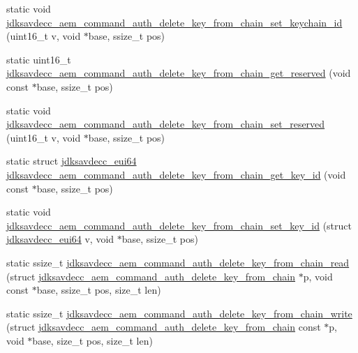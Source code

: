 \begin{DoxyCompactItemize}
\item 
static void \hyperlink{group__command__auth__delete__key__from__chain_ga363dacdcc27889331e0861ae0f44d4d0}{jdksavdecc\+\_\+aem\+\_\+command\+\_\+auth\+\_\+delete\+\_\+key\+\_\+from\+\_\+chain\+\_\+set\+\_\+keychain\+\_\+id} (uint16\+\_\+t v, void $\ast$base, ssize\+\_\+t pos)
\item 
static uint16\+\_\+t \hyperlink{group__command__auth__delete__key__from__chain_ga49a6f38c77bc0d0ead0b9743194297f9}{jdksavdecc\+\_\+aem\+\_\+command\+\_\+auth\+\_\+delete\+\_\+key\+\_\+from\+\_\+chain\+\_\+get\+\_\+reserved} (void const $\ast$base, ssize\+\_\+t pos)
\item 
static void \hyperlink{group__command__auth__delete__key__from__chain_gac25781fadb6b56cff3c42fd8d4728aed}{jdksavdecc\+\_\+aem\+\_\+command\+\_\+auth\+\_\+delete\+\_\+key\+\_\+from\+\_\+chain\+\_\+set\+\_\+reserved} (uint16\+\_\+t v, void $\ast$base, ssize\+\_\+t pos)
\item 
static struct \hyperlink{structjdksavdecc__eui64}{jdksavdecc\+\_\+eui64} \hyperlink{group__command__auth__delete__key__from__chain_ga00b12cbc1d1695d6a006ba72fa5a9ba2}{jdksavdecc\+\_\+aem\+\_\+command\+\_\+auth\+\_\+delete\+\_\+key\+\_\+from\+\_\+chain\+\_\+get\+\_\+key\+\_\+id} (void const $\ast$base, ssize\+\_\+t pos)
\item 
static void \hyperlink{group__command__auth__delete__key__from__chain_ga246f987b0bd36f564dd66f7570c59709}{jdksavdecc\+\_\+aem\+\_\+command\+\_\+auth\+\_\+delete\+\_\+key\+\_\+from\+\_\+chain\+\_\+set\+\_\+key\+\_\+id} (struct \hyperlink{structjdksavdecc__eui64}{jdksavdecc\+\_\+eui64} v, void $\ast$base, ssize\+\_\+t pos)
\item 
static ssize\+\_\+t \hyperlink{group__command__auth__delete__key__from__chain_gad3136912c47d7ab8cd7a63e71f907559}{jdksavdecc\+\_\+aem\+\_\+command\+\_\+auth\+\_\+delete\+\_\+key\+\_\+from\+\_\+chain\+\_\+read} (struct \hyperlink{structjdksavdecc__aem__command__auth__delete__key__from__chain}{jdksavdecc\+\_\+aem\+\_\+command\+\_\+auth\+\_\+delete\+\_\+key\+\_\+from\+\_\+chain} $\ast$p, void const $\ast$base, ssize\+\_\+t pos, size\+\_\+t len)
\item 
static ssize\+\_\+t \hyperlink{group__command__auth__delete__key__from__chain_ga9d43c1e7add9c5f46614748431f6555e}{jdksavdecc\+\_\+aem\+\_\+command\+\_\+auth\+\_\+delete\+\_\+key\+\_\+from\+\_\+chain\+\_\+write} (struct \hyperlink{structjdksavdecc__aem__command__auth__delete__key__from__chain}{jdksavdecc\+\_\+aem\+\_\+command\+\_\+auth\+\_\+delete\+\_\+key\+\_\+from\+\_\+chain} const $\ast$p, void $\ast$base, size\+\_\+t pos, size\+\_\+t len)
\end{DoxyCompactItemize}


